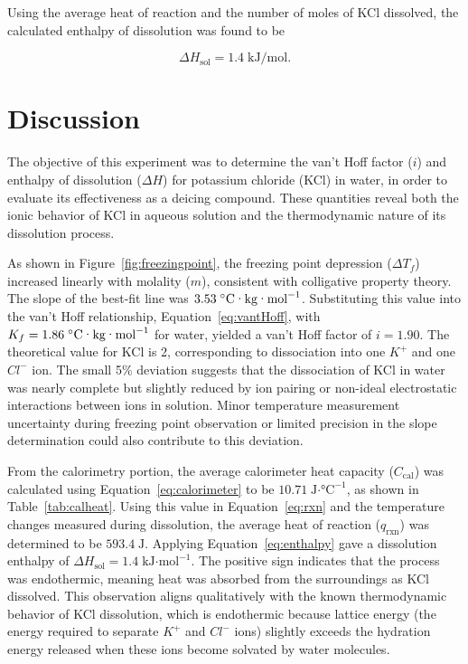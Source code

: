 \documentclass[11pt,letterpaper]{article}
\begin{document}
Using the average heat of reaction and the number of moles of KCl dissolved, the calculated enthalpy of dissolution was found to be

\[
\Delta H_{\text{sol}} = 1.4\;\text{kJ/mol}.
\]



\section*{Discussion}

The objective of this experiment was to determine the van’t Hoff factor ($i$) and enthalpy of dissolution ($\Delta H$) for potassium chloride (KCl) in water, in order to evaluate its effectiveness as a deicing compound. These quantities reveal both the ionic behavior of KCl in aqueous solution and the thermodynamic nature of its dissolution process.

As shown in Figure~\ref{fig:freezingpoint}, the freezing point depression ($\Delta T_f$) increased linearly with molality ($m$), consistent with colligative property theory. The slope of the best-fit line was $3.53\;^\circ\text{C·kg·mol}^{-1}$. Substituting this value into the van’t Hoff relationship, {Equation~\ref{eq:vantHoff}}, with $K_f = 1.86\;^\circ\text{C·kg·mol}^{-1}$ for water, yielded a van’t Hoff factor of $i = 1.90$. The theoretical value for KCl is 2, corresponding to dissociation into one $K^+$ and one $Cl^-$ ion.\cite{ref3} The small 5\% deviation suggests that the dissociation of KCl in water was nearly complete but slightly reduced by ion pairing or non-ideal electrostatic interactions between ions in solution. Minor temperature measurement uncertainty during freezing point observation or limited precision in the slope determination could also contribute to this deviation.

From the calorimetry portion, the average calorimeter heat capacity ($C_{\text{cal}}$) was calculated using {Equation~\ref{eq:calorimeter}} to be $10.71\;\text{J·°C}^{-1}$, as shown in Table~\ref{tab:calheat}. Using this value in {Equation~\ref{eq:rxn}} and the temperature changes measured during dissolution, the average heat of reaction ($q_{\text{rxn}}$) was determined to be $593.4\;\text{J}$. Applying {Equation~\ref{eq:enthalpy}} gave a dissolution enthalpy of $\Delta H_{\text{sol}} = 1.4\;\text{kJ·mol}^{-1}$. The positive sign indicates that the process was endothermic, meaning heat was absorbed from the surroundings as KCl dissolved. This observation aligns qualitatively with the known thermodynamic behavior of KCl dissolution, which is endothermic because lattice energy (the energy required to separate $K^+$ and $Cl^-$ ions) slightly exceeds the hydration energy released when these ions become solvated by water molecules.
\end{document}
